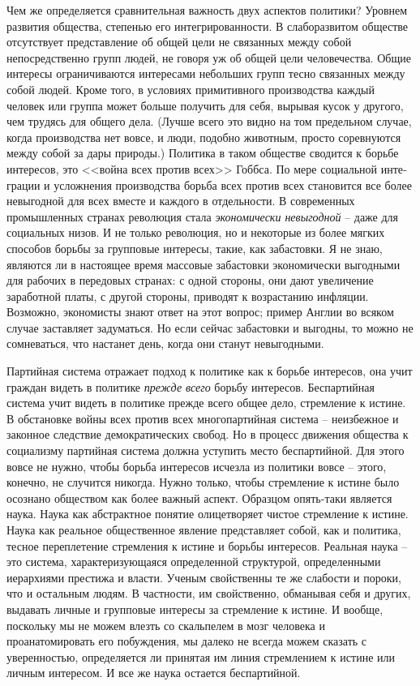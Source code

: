 \documentclass{book}
\begin{document}
Чем же определяется сравнительная важность двух аспектов политики? Уровнем развития общества, степенью его интегрированности. В слаборазвитом обществе отсутствует представ­ление об общей цели не связанных между собой непосредствен­но групп людей, не говоря уж об общей цели человечества. Общие интересы ограничиваются интересами небольших групп тесно связанных между собой людей. Кроме того, в условиях примитивного производства каждый человек или группа может больше получить для себя, вырывая кусок у другого, чем тру­дясь для общего дела. (Лучше всего это видно на том предель­ном случае, когда производства нет вовсе, и люди, подобно животным, просто соревнуются между собой за дары природы.) Политика в таком обществе сводится к борьбе интересов, это <<война всех против всех>> Гоббса. По мере социальной инте­грации и усложнения производства борьба всех против всех становится все более невыгодной для всех вместе и каждого в отдельности. В современных промышленных странах революция стала \textit{экономически невыгодной} --  
даже для со­циальных низов. И не только революция, но и некоторые из более мягких способов борьбы за групповые интересы, такие, как забастовки. Я не знаю, являются ли в настоящее время массовые забастовки экономически выгодными для рабочих в передовых странах: с одной стороны, они дают увеличение заработной платы, с другой стороны, приводят к возрастанию инфляции. Возможно, экономисты знают ответ на этот вопрос; пример Англии во всяком случае заставляет задуматься. Но если сейчас забастовки и выгодны, то можно не сомневаться, что настанет день, когда они станут невыгодными.

Партийная система отражает подход к политике как к борь­бе интересов, она учит граждан видеть в политике \textit{прежде всего} борьбу интересов. Беспартийная система учит видеть в политике прежде всего общее дело, стремление к истине. В обстанов­ке войны всех против всех многопартийная система -- неиз­бежное и законное следствие демократических свобод. Но в процесс движения общества к социализму партийная система должна уступить место беспартийной. Для этого вовсе не нуж­но, чтобы борьба интересов исчезла из политики вовсе -- этого, конечно, не случится никогда. Нужно только, чтобы стремле­ние к истине было осознано обществом как более важный аспект. Образцом опять-таки является наука. Наука как абстрактное понятие олицетворяет чистое стремление к истине. Наука как реальное общественное явление представляет собой, как и политика, тесное переплетение стремления к истине и борьбы интересов. Реальная наука -- это система, характеризующаяся определенной структурой, определенными иерархиями престижа и власти. Ученым 
свойственны те же слабости и пороки, что и остальным людям. В частности, им свойственно, обманывая себя и других, выдавать личные и групповые интересы за стремление к истине. И вообще, поскольку мы не можем влезть со скальпелем в мозг человека и проанатомировать его побуждения, мы далеко не всегда можем сказать с уверенностью, определяется ли принятая им линия стремле­нием к истине или личным интересом. И все же наука остает­ся беспартийной.
\end{document}
